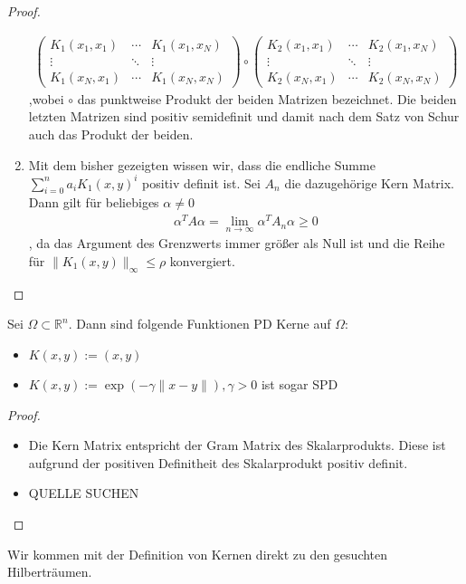 \begin{proof}
\begin{enumerate}
\begin{align*}
\begin{pmatrix}
K_1(x_1,x_1) & \cdots & K_1(x_1,x_N) \\ 
\vdots & \ddots & \vdots \\ 
K_1(x_N,x_1) & \cdots & K_1(x_N,x_N)
\end{pmatrix}
\circ
\begin{pmatrix}
K_2(x_1, x_1) & \cdots & K_2(x_1, x_N) \\ 
\vdots & \ddots & \vdots \\ 
K_2(x_N, x_1) & \cdots & K_2(x_N, x_N)
\end{pmatrix}
\end{align*}
,wobei $\circ$ das punktweise Produkt der beiden Matrizen bezeichnet. 
Die beiden letzten Matrizen sind positiv semidefinit und damit nach dem Satz von Schur auch das Produkt der beiden.
\item
Mit dem bisher gezeigten wissen wir, dass die endliche Summe $\sum_{i=0}^n a_i K_1(x,y)^i$ positiv definit ist. Sei $A_n$ die dazugehörige Kern Matrix. Dann gilt für beliebiges $\alpha \neq 0$
\begin{align*}
\alpha^T A \alpha = \lim_{n \rightarrow \infty} \alpha^T A_n \alpha \geq 0
\end{align*}
, da das Argument des Grenzwerts immer größer als Null ist und die Reihe für $\|K_1(x,y)\|_\infty \leq \rho $ konvergiert.
\end{enumerate}
\end{proof}
\begin{example} Sei $\Omega \subset \mathbb{R}^n$. Dann sind folgende Funktionen \ac{PD} Kerne auf $\Omega$:
\begin{itemize}
\item $K(x,y) := (x,y)$
\item $K(x,y) := \exp(-\gamma \|x-y\|),\gamma > 0$ ist sogar \ac{SPD}
\end{itemize}
\end{example}

\begin{proof}
\begin{itemize}
\item
Die Kern Matrix entspricht der Gram Matrix des Skalarprodukts. Diese ist aufgrund der positiven Definitheit des Skalarprodukt positiv definit. 
\item
QUELLE SUCHEN
\end{itemize}
\end{proof}
Wir kommen mit der Definition von Kernen direkt zu den gesuchten Hilberträumen.

